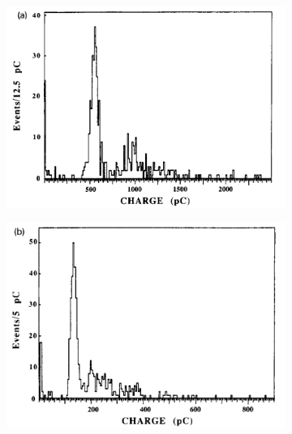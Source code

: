 	\begin{figure}[H]
		\begin{subfigure}{0.5\linewidth}
			\centering
			\includegraphics[width = 0.5\plotwidth]{fig/chapt4/Gas-mix-0-freon.png}
			\caption{\label{fig:FreonCharge:A}}
		\end{subfigure}
		\begin{subfigure}{0.5\linewidth}
			\centering
			\includegraphics[width = 0.5\plotwidth]{fig/chapt4/Gas-mix-4-freon.png}
			\caption{\label{fig:FreonCharge:B}}
		\end{subfigure}
		\begin{subfigure}{\linewidth}
			\centering

\end{subfigure}
\end{figure}
